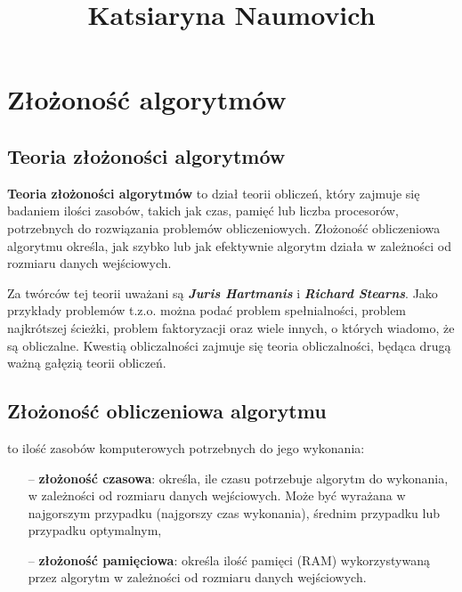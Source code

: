 \begin{center}
\begin{LARGE}
\title{\textbf{Katsiaryna Naumovich}}
\end{LARGE}
\end{center}

\maketitle

\section{Złożoność algorytmów}

\subsection{Teoria złożoności algorytmów}
\begin{justify}
\textbf{Teoria złożoności algorytmów} to dział teorii obliczeń, który zajmuje się badaniem ilości zasobów, takich jak czas, pamięć lub liczba procesorów, potrzebnych do rozwiązania problemów obliczeniowych. Złożoność obliczeniowa algorytmu określa, jak szybko lub jak efektywnie algorytm działa w zależności od rozmiaru danych wejściowych. \par Za twórców tej teorii uważani są \textbf{\textit{Juris Hartmanis}} i \textbf{\textit{Richard Stearns}}. Jako przykłady problemów t.z.o. można podać problem spełnialności, problem najkrótszej ścieżki, problem faktoryzacji oraz wiele innych, o których wiadomo, że są obliczalne. Kwestią obliczalności zajmuje się teoria obliczalności, będąca drugą ważną gałęzią teorii obliczeń.
\end{justify}

\subsection{Złożoność obliczeniowa algorytmu}
\begin{center}
to ilość zasobów komputerowych potrzebnych do jego wykonania:
\end{center}
\begin{itemize}
	\item[--] \textbf{złożoność czasowa}: określa, ile czasu potrzebuje algorytm do wykonania, w zależności od rozmiaru danych wejściowych. Może być wyrażana w najgorszym przypadku (najgorszy czas wykonania), średnim przypadku lub przypadku optymalnym,
	\item[--] \textbf{złożoność pamięciowa}: określa ilość pamięci (RAM) wykorzystywaną przez algorytm w zależności od rozmiaru danych wejściowych.
\end{itemize}

